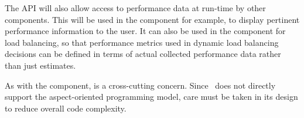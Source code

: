 \documentclass[10pt,twocolumn]{article}
\begin{document}
The API will also allow access to performance data at run-time by
other components.  This will be used in the  component
for example, to display pertinent performance information to the user.
It can also be used in the  component for load
balancing, so that performance metrics used in dynamic load balancing
decisions can be defined in terms of actual collected performance data
rather than just estimates.

As with the  component,  is a
cross-cutting concern.  Since \cpp\ does not directly support the
aspect-oriented programming model, care must be taken in its design to
reduce overall code complexity.

% 
% 
% 
% 



\end{document}
